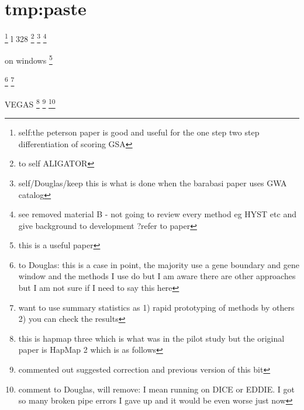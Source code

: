 \section{tmp:paste}
 \footnote{self:the peterson paper is good and useful for the one step two step differentiation of scoring GSA}
 l 328
\footnote{to self ALIGATOR}
\footnote{self/Douglas/keep this is what is done when the barabasi paper uses GWA catalog}
\footnote{see removed material B - not going to review every method eg HYST etc and give background to development ?refer to paper}
 
 on windows \cite{petersen2013assessing}\footnote{this is a useful paper}
 
 \footnote{to Douglas: this is a case in point, the majority use a gene boundary and gene window and the methods I use do but I am aware there are other approaches but I am not sure if I need to say this here}
  \footnote{want to use summary statistics as 1) rapid prototyping of methods by others 2) you can check the results}
  
  
 VEGAS \footnote{this is hapmap three which is what was in the pilot study but the original paper is HapMap 2 which is as follows}\cite{international2007second}
 \footnote{commented out suggested correction and previous version of this bit}%
\footnote{comment to Douglas, will remove: I mean running on DICE or EDDIE. I got so many broken pipe errors I gave up and it would be even worse just now}

